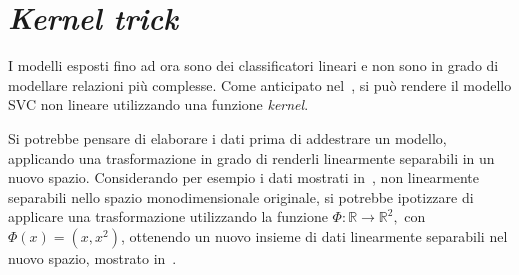 \section{\emph{Kernel trick}}\label{sec:kernel_trick}
I modelli esposti fino ad ora sono dei classificatori lineari e non sono in grado di modellare relazioni più complesse.
Come anticipato nel~, si può rendere il modello SVC non lineare utilizzando una funzione \emph{kernel}.

Si potrebbe pensare di elaborare i dati prima di addestrare un modello, applicando una trasformazione in grado di renderli linearmente separabili in un nuovo spazio.
Considerando per esempio i dati mostrati in~, non linearmente separabili nello spazio monodimensionale originale, si potrebbe ipotizzare di applicare una trasformazione utilizzando la funzione $\Phi:\mathbb{R} \rightarrow \mathbb{R}^2,$ con $\Phi(x) = (x, x^2)$, ottenendo un nuovo insieme di dati linearmente separabili nel nuovo spazio, mostrato in~. 

